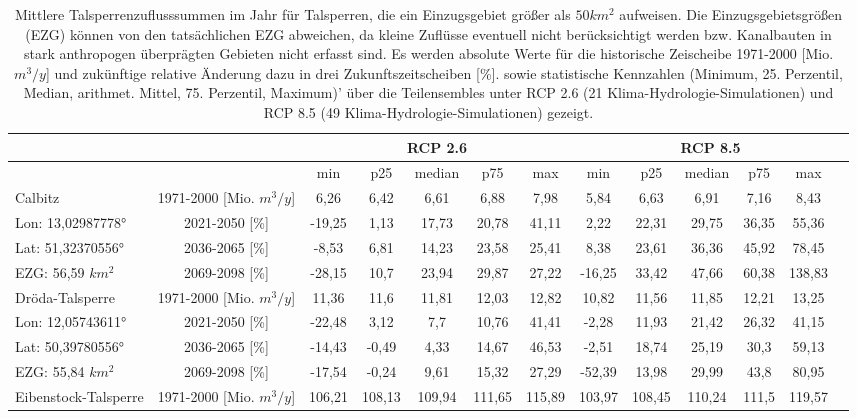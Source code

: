 \renewcommand{\arraystretch}{1.2}
\addtolength{\tabcolsep}{-5.9pt}
\scriptsize
\begin{longtable}{@{\extracolsep{\fill}}lc|ccccc||cccccc}
\caption{Mittlere Talsperrenzuflusssummen im Jahr für Talsperren, die ein Einzugsgebiet größer als $50 km^2$ aufweisen. Die Einzugsgebietsgrößen (EZG) können von den tatsächlichen EZG abweichen, da kleine Zuflüsse eventuell nicht berücksichtigt werden bzw. Kanalbauten in stark anthropogen überprägten Gebieten nicht erfasst sind. Es werden absolute Werte für die historische Zeischeibe 1971-2000 [Mio. $m^3/y$] und zukünftige relative Änderung dazu in drei Zukunftszeitscheiben [\%]. sowie statistische Kennzahlen (Minimum, 25. Perzentil, Median, arithmet. Mittel, 75. Perzentil, Maximum)' über die Teilensembles unter RCP 2.6 (21 Klima-Hydrologie-Simulationen) und RCP 8.5 (49 Klima-Hydrologie-Simulationen) gezeigt.}\\  \hline
\multicolumn{2}{c}{} & \multicolumn{5}{c||}{RCP 2.6}  & \multicolumn{6}{c}{RCP 8.5}\\ \hline
\multicolumn{2}{c|}{} & min & p25 & median & p75 & max & min & p25 & median & p75 & max\\ 
\hline 
Calbitz & 1971-2000 [Mio. $m^3/y$]  & 6,26 & 6,42 & 6,61 & 6,88 & 7,98 & 5,84 & 6,63 & 6,91 & 7,16 & 8,43 & \\ 
\cline{2-13} 
Lon: 13,02987778° & 2021-2050 [\%]  & -19,25 & 1,13 & 17,73 & 20,78 & 41,11 & 2,22 & 22,31 & 29,75 & 36,35 & 55,36 & \\ 
Lat: 51,32370556° & 2036-2065 [\%]  & -8,53 & 6,81 & 14,23 & 23,58 & 25,41 & 8,38 & 23,61 & 36,36 & 45,92 & 78,45 & \\ 
EZG: 56,59 $km^2$ & 2069-2098 [\%]  & -28,15 & 10,7 & 23,94 & 29,87 & 27,22 & -16,25 & 33,42 & 47,66 & 60,38 & 138,83 & \\ 
\hline 
Dröda-Talsperre & 1971-2000 [Mio. $m^3/y$]  & 11,36 & 11,6 & 11,81 & 12,03 & 12,82 & 10,82 & 11,56 & 11,85 & 12,21 & 13,25 & \\ 
\cline{2-13} 
Lon: 12,05743611° & 2021-2050 [\%]  & -22,48 & 3,12 & 7,7 & 10,76 & 41,41 & -2,28 & 11,93 & 21,42 & 26,32 & 41,15 & \\ 
Lat: 50,39780556° & 2036-2065 [\%]  & -14,43 & -0,49 & 4,33 & 14,67 & 46,53 & -2,51 & 18,74 & 25,19 & 30,3 & 59,13 & \\ 
EZG: 55,84 $km^2$ & 2069-2098 [\%]  & -17,54 & -0,24 & 9,61 & 15,32 & 27,29 & -52,39 & 13,98 & 29,99 & 43,8 & 80,95 & \\ 
\hline 
Eibenstock-Talsperre & 1971-2000 [Mio. $m^3/y$]  & 106,21 & 108,13 & 109,94 & 111,65 & 115,89 & 103,97 & 108,45 & 110,24 & 111,5 & 119,57 & \\ 

\end{longtable}
